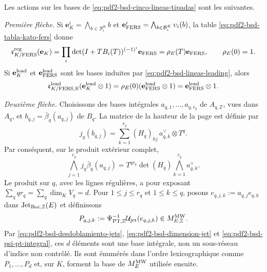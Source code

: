 \begin{proposition}
\label{prop:pdf2-bsd-cuatro-flechas-generadores}
Les actions sur les bases de
\eqref{eq:pdf2-bsd-cinco-lineas-tipadas} sont les suivantes.

\emph{Première flèche.} Si
$\mathbf e_K^i=\bigwedge_{b\in\mathcal B_i^K}b$ et
$\mathbf e_{\rm FERS}^i=\bigwedge_{b\in\mathcal B_i^K}\upsilon_i(b)$,
la table \eqref{eq:pdf2-bsd-tabla-kato-fers} donne
\begin{equation}\label{eq:pdf2-bsd-c1-generadores}
 \mathfrak c_{K/{\rm FERS}}^{\rm reg}(\mathbf e_K)
 =\prod_i\det(I+TB_i(T))^{(-1)^i}\mathbf e_{\rm FERS}
 =\rho_E(T)\mathbf e_{\rm FERS},
 \qquad \rho_E(0)=1.
\end{equation}
Si $\mathbf e_K^{\rm lead}$ et $\mathbf e_{\rm FERS}^{\rm lead}$ sont les
bases induites par \eqref{eq:pdf2-bsd-lineas-leading}, alors
\begin{equation}\label{eq:pdf2-bsd-c1-leading-generador}
 \mathfrak c_{K/{\rm FERS},\mathbb R}^{\rm lead}
     (\mathbf e_K^{\rm lead}\otimes1)
 =\rho_E(0)(\mathbf e_{\rm FERS}^{\rm lead}\otimes1)
 =\mathbf e_{\rm FERS}^{\rm lead}\otimes1.
\end{equation}

\emph{Deuxième flèche.} Choisissons des bases intégrales
$a_{q,1},\ldots,a_{q,r_q}$ de $A_{q,\mathbb Z}$, vues dans $A_q$, et
$b_{q,j}=\bar\beta_q(a_{q,j})$ de $B_q$. La matrice de la hauteur de la page
est définie par
\begin{equation}\label{eq:pdf2-bsd-hq-generadores}
 j_q(b_{q,j})=
 \sum_{k=1}^{r_q}(H_q)_{kj}\,a_{q,k}^\vee\otimes T^q.
\end{equation}
Par conséquent, sur le produit extérieur complet,
\begin{equation}\label{eq:pdf2-bsd-c2-cuna-paginas}
 \bigwedge_{j=1}^{r_q}j_q\bar\beta_q(a_{q,j})
 =T^{qr_q}\det(H_q)
  \bigwedge_{k=1}^{r_q}a_{q,k}^\vee.
\end{equation}
Le produit sur $q$, avec les lignes régulières, a pour exposant
$\sum_q qr_q=\sum_q\dim_K V_q=d$. Pour
$1\leq j\leq r_q$ et $1\leq k\leq q$, posons
$e_{q,j,k}:=a_{q,j}e_{q,k}$ dans
$\operatorname{Jet}_{\rm Boc,\mathbb Z}(E)$ et définissons
\begin{equation}\label{eq:pdf2-bsd-base-mw-desde-jets}
 P_{q,j,k}:=\Psi_{{\rm PT},\mathbb Z}^{-1}
       \mathcal U_{\rm jet}(e_{q,j,k})
 \in M_{E,\mathbb Z}^{\rm MW}.
\end{equation}
Par \eqref{eq:pdf2-bsd-desdoblamiento-jets},
\eqref{eq:pdf2-bsd-dimension-jet} et
\eqref{eq:pdf2-bsd-psi-pt-integral}, ces $d$ éléments sont une base
intégrale, non un sous-réseau d'indice non contrôlé. Ils sont énumérés dans l'ordre
lexicographique comme $P_1,\ldots,P_d$ et, sur $K$, forment la base de
$M_E^{\rm MW}$ utilisée ensuite.


\end{proposition}
